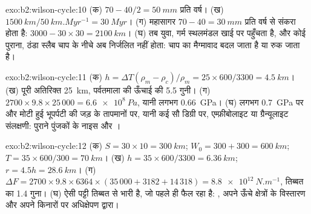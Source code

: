 \begin{solution}{exo:b2:wilson-cycle:10}
(क) $70 - 40/2 = \qty{50}{mm}$ प्रति वर्ष। (ख) $\qty{1500}{km}/\qty{50}{km.Myr^{-1}} =
\qty{30}{Myr}$। (ग) महासागर $70 - 40 = \qty{30}{mm}$ प्रति वर्ष से संकरा होता है: $3000 - 30\times30 =
\qty{2100}{km}$। (घ) तब युवा, गर्म स्थलमंडल खाई पर पहुँचता है, और कोई पुराना, ठंडा स्लैब
चाप के नीचे अब निर्जलित नहीं होता: चाप का मैग्मावाद बदल जाता है या रुक जाता है।
\end{solution}

\begin{solution}{exo:b2:wilson-cycle:11}
(क) $h = \Delta T(\rho_m - \rho_c)/\rho_m = 25\times600/3300 = \qty{4.5}{km}$। (ख) पूरी अतिरिक्त
\qty{25}{km}, पर्वतमाला की ऊँचाई की 5.5 गुनी। (ग) $2700\times9.8\times25\,000 =
\qty{6.6e8}{Pa}$, यानी लगभग \qty{0.66}{GPa}। (घ) लगभग \qty{0.7}{GPa} पर और मोटी हुई भूपर्पटी की
जड़ के तापमानों पर, यानी कई सौ डिग्री पर, एम्फ़ीबोलाइट या ग्रैन्यूलाइट
संलक्षणी: पुराने पुंजकों के नाइस और ।
\end{solution}

\begin{solution}{exo:b2:wilson-cycle:12}
(क) $S = 30\times10 = \qty{300}{km}$; $W_0 = 300 + 300 = \qty{600}{km}$; $T = 35\times600/300 =
\qty{70}{km}$। (ख) $h = 35\times600/3300 = \qty{6.36}{km}$; $r = 4.5h = \qty{28.6}{km}$।
(ग) $\Delta F = 2700\times9.8\times6364\times(35\,000 + 3182 + 14\,318) =
\qty{8.8e12}{N.m^{-1}}$, तिब्बत का 1.4 गुना। (घ) ऐसी पट्टी तिब्बत से भारी है, जो पहले ही
फैल रहा है: , अपने ऊँचे क्षेत्रों के विस्तारण और अपने किनारों पर अधिक्षेपण द्वारा।
\end{solution}

